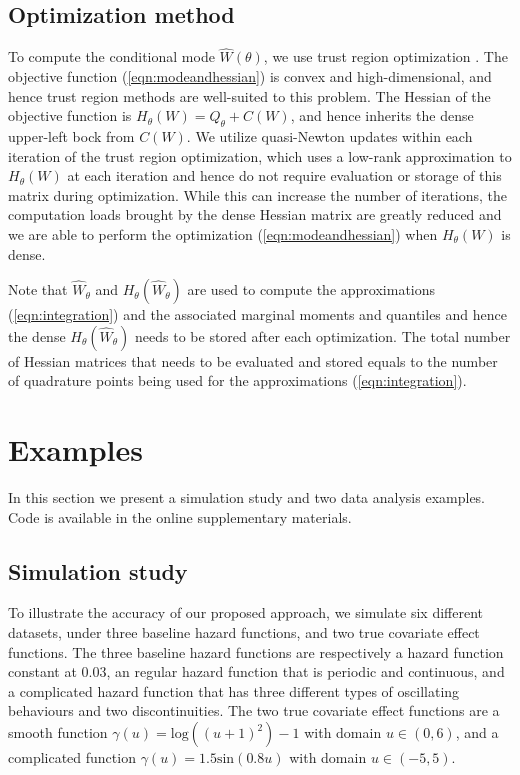 \documentclass[ba]{imsart}
\begin{document}
\subsection{Optimization method}\label{subsec:opt}

To compute the conditional mode $\hat{W}(\theta)$, we use trust region optimization \citep{trustoptim}. The objective function (\ref{eqn:modeandhessian}) is convex and high-dimensional, and hence trust region methods are well-suited to this problem. The Hessian of the objective function is $H_{\theta}(W) = Q_{\theta} + C(W)$, and hence inherits the dense upper-left bock from $C(W)$. We utilize quasi-Newton updates within each iteration of the trust region optimization, which uses a low-rank approximation to $H_{\theta}(W)$ at each iteration and hence do not require evaluation or storage of this matrix during optimization. While this can increase the number of iterations, the computation loads brought by the dense Hessian matrix are greatly reduced and we are able to perform the optimization (\ref{eqn:modeandhessian}) when $H_{\theta}(W)$ is dense. 

Note that $\widehat{W}_{\theta}$ and $H_{\theta}(\widehat{W}_{\theta})$ are used to compute the approximations (\ref{eqn:integration}) and the associated marginal moments and quantiles and hence the dense $H_{\theta}(\widehat{W}_{\theta})$ needs to be stored after each optimization. The total number of Hessian matrices that needs to be evaluated and stored equals to the number of quadrature points being used for the approximations (\ref{eqn:integration}).


\section{Examples}\label{sec:example}

In this section we present a simulation study and two data analysis examples. Code is available in the online supplementary materials.

\subsection{Simulation study}\label{subsec:sim}

To illustrate the accuracy of our proposed approach, we simulate six different datasets, under three baseline hazard functions, and two true covariate effect functions. The three baseline hazard functions are respectively a hazard function constant at 0.03, an regular hazard function that is periodic and continuous, and a complicated hazard function that has three different types of oscillating behaviours and two discontinuities. The two true covariate effect functions are a smooth function $\gamma(u) = \text{log}((u + 1)^2) - 1$ with domain $u \in (0,6)$, and a complicated function $\gamma(u) = 1.5 \text{sin}(0.8 u)$ with domain $ u \in (-5,5)$.
\end{document}
